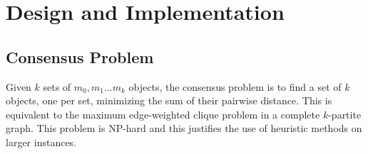 \documentclass[10pt,letterpaper]{article}
\begin{document}





\newpage
\section*{Design and Implementation}

\subsection*{Consensus Problem}
Given $k$ sets of $m_0, m_1... m_k$ objects, the consensus problem is to find a set of $k$ objects, one per set, minimizing the sum of their pairwise distance.
This is equivalent to the maximum edge-weighted clique problem in a complete $k$-partite graph. This problem is NP-hard and this justifies the use of heuristic methods on larger instances.









\end{document}
